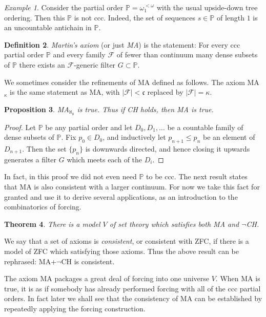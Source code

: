 \documentclass[11pt,oneside]{amsbook}
\newcommand{\PP}{\mathbb P}
\theoremstyle{definition}
\theoremstyle{plain}
\newtheorem{thm}{Theorem}[section]
\newtheorem{prop}[thm]{Proposition}
\theoremstyle{definition}
\newtheorem{defn}[thm]{Definition}
\theoremstyle{remark}
\newtheorem{example}[thm]{Example}
\numberwithin{equation}{section}
\numberwithin{figure}{section}
\begin{document}
\begin{example}
  Consider the partial order $\PP=\omega_1^{<\omega}$ with the usual upside-down tree ordering. Then this $\PP$ is not ccc. Indeed, the set of sequences $s\in\PP$ of length $1$ is an uncountable antichain in $\PP$.
\end{example}

\begin{defn}
  \emph{Martin's axiom} (or just \emph{MA}) is the statement: For every ccc partial order $\PP$ and every family $\mathcal F$ of fewer than continuum many dense subsets of $\PP$ there exists an $\mathcal F$-generic filter $G\subset\PP$.
\end{defn}

We sometimes consider the refinements of MA defined as follows. The axiom MA$_\kappa$ is the same statement as MA, with $|\mathcal F|<\mathfrak c$ replaced by $|\mathcal F|=\kappa$.

\begin{prop}
  \label{prop:ma-aleph0}
  MA$_{\aleph_0}$ is true. Thus if CH holds, then MA is true.
\end{prop}

\begin{proof}
  Let $\PP$ be any partial order and let $D_0,D_1,\ldots$ be a countable family of dense subsets of $\PP$. Fix $p_0\in D_0$, and inductively let $p_{n+1}\leq p_n$ be an element of $D_{n+1}$. Then the set $\{p_n\}$ is downwards directed, and hence closing it upwards generates a filter $G$ which meets each of the $D_i$.
\end{proof}

In fact, in this proof we did not even need $\PP$ to be ccc. The next result states that MA is also consistent with a larger continuum. For now we take this fact for granted and use it to derive several applications, as an introduction to the combinatorics of forcing. 

\begin{thm}
  There is a model $V$ of set theory which satisfies both MA and $\neg$CH.
\end{thm}

We say that a set of axioms is \emph{consistent}, or consistent with ZFC, if there is a model of ZFC which satisfying those axioms. Thus the above result can be rephrased: MA+$\neg$CH is consistent.

The axiom MA packages a great deal of forcing into one universe $V$. When MA is true, it is as if somebody has already performed forcing with all of the ccc partial orders. In fact later we shall see that the consistency of MA can be established by repeatedly applying the forcing construction.
\end{document}
